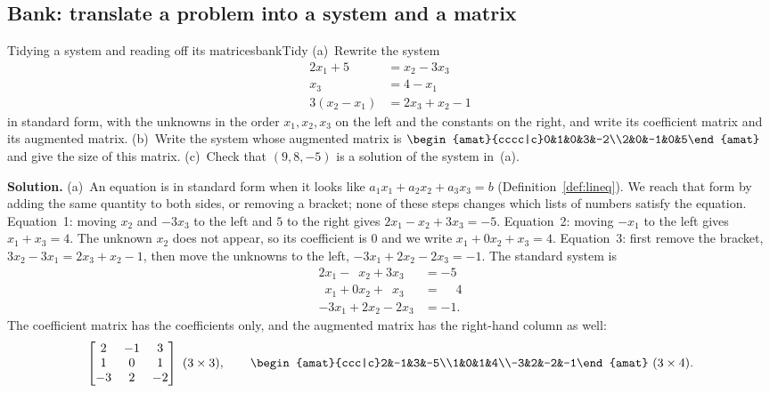 \documentclass[11pt]{article}
\begin{document}
\subsection*{Bank: translate a problem into a system and a matrix}

\begin{exmp}{Tidying a system and reading off its matrices}{bankTidy}
(a)~Rewrite the system
\[
\begin{aligned}
2x_1+5&=x_2-3x_3\\
x_3&=4-x_1\\
3(x_2-x_1)&=2x_3+x_2-1
\end{aligned}
\]
in standard form, with the unknowns in the order $x_1,x_2,x_3$ on the left and the constants on the right, and write its coefficient matrix and its augmented matrix. (b)~Write the system whose augmented matrix is $\begin{amat}{cccc|c}0&1&0&3&-2\\2&0&-1&0&5\end{amat}$ and give the size of this matrix. (c)~Check that $(9,8,-5)$ is a solution of the system in~(a).

\textbf{Solution.} (a)~An equation is in standard form when it looks like $a_1x_1+a_2x_2+a_3x_3=b$ (Definition~\ref{def:lineq}). We reach that form by adding the same quantity to both sides, or removing a bracket; none of these steps changes which lists of numbers satisfy the equation. Equation~1: moving $x_2$ and $-3x_3$ to the left and $5$ to the right gives $2x_1-x_2+3x_3=-5$. Equation~2: moving $-x_1$ to the left gives $x_1+x_3=4$. The unknown $x_2$ does not appear, so its coefficient is $0$ and we write $x_1+0x_2+x_3=4$. Equation~3: first remove the bracket, $3x_2-3x_1=2x_3+x_2-1$, then move the unknowns to the left, $-3x_1+2x_2-2x_3=-1$. The standard system is
\[
\begin{aligned}
2x_1-\phantom{2}x_2+3x_3&=-5\\
\phantom{2}x_1+0x_2+\phantom{3}x_3&=\phantom{-}4\\
-3x_1+2x_2-2x_3&=-1.
\end{aligned}
\]
The coefficient matrix has the coefficients only, and the augmented matrix has the right-hand column as well:
\[
\begin{bmatrix}2&-1&3\\1&0&1\\-3&2&-2\end{bmatrix}\ (3\times3),\qquad
\begin{amat}{ccc|c}2&-1&3&-5\\1&0&1&4\\-3&2&-2&-1\end{amat}\ (3\times4).
\]


\end{exmp}
\end{document}
